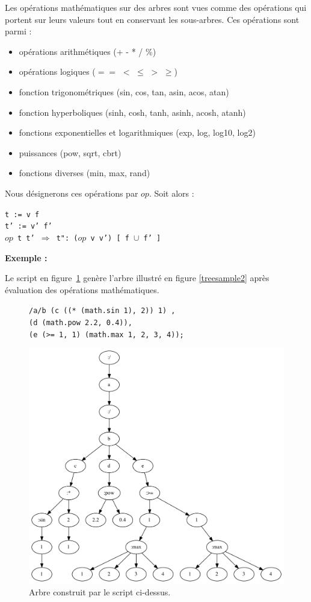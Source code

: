 \documentclass{article}
\newcommand{\exemple}	{\vspace*{1mm}\hspace*{-4mm}\textbf{Exemple :}}
\newcommand{\code}	[2][0.9]		{\vspace{0mm}\begin{center}\colorbox{mygrey}{
							\begin{minipage}[t]{#1\columnwidth} 
							{\small \texttt{#2}}
							\end{minipage}}\end{center}}
\newcommand{\op}	[1]		{\vspace{0mm}\begin{center}\colorbox{mygrey}{
							\begin{minipage}[t]{0.9\columnwidth} 
							{\small \texttt{#1}}
							\end{minipage}}\end{center}}
\newcommand{\binop}		{$op$}
\newcommand{\ulb}		{\hspace*{4mm}}
\begin{document}
Les opérations mathématiques sur des arbres sont vues comme des opérations qui portent sur leurs valeurs tout en conservant les sous-arbres. Ces opérations sont parmi :
\begin{itemize}
\item opérations arithmétiques (+ - * / \%)
\item opérations logiques ($==$ $<$ $\leq$ $>$ $\geq$)
\item fonction trigonométriques (sin, cos, tan, asin, acos, atan)
\item fonction hyperboliques (sinh, cosh, tanh, asinh, acosh, atanh)
\item fonctions exponentielles et logarithmiques (exp, log, log10, log2)
\item puissances (pow, sqrt, cbrt)
\item fonctions diverses (min, max, rand)
\end{itemize}

Nous désignerons ces opérations par \binop. Soit alors :
\op{t :=  v f\\
t' := v' f'\\
\binop\ t t'  $\Rightarrow$  t":  (\binop\ v v') [ f $\cup$ f' ]  
}

\exemple

Le script en figure~\ref{parsesample2} genère l'arbre illustré en figure \ref{treesample2} après évaluation des opérations mathématiques.

\begin{figure}[htbp]
\code{/a/b 	(c ((* (math.sin 1), 2)) 1) ,\\
\ulb		(d (math.pow 2.2, 0.4)),\\
\ulb		(e (>= 1, 1) (math.max 1, 2, 3, 4));}
\begin{center}
\includegraphics[width=1\columnwidth]{tree/sample3}
\caption{Arbre construit par le script ci-dessus.}
\label{parsesample2}
\end{center}
\end{figure}
\end{document}
